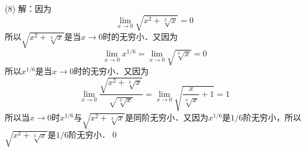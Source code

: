 \medskip
(8) 解：因为
\begin{equation}
    \lim_{x \to 0} \sqrt{x^2+\sqrt[3]{x}} = 0
\end{equation}
所以$\sqrt{x^2+\sqrt[3]{x}}$是当$x \to 0$时的无穷小．又因为
\begin{equation}
    \lim_{x \to 0} {\displaystyle x^{1/6}} = \lim_{x \to 0} \sqrt{\sqrt[3]{x}} = 0
\end{equation}
所以$x^{1/6}$是当$x \to 0$时的无穷小．又因为
\begin{equation}
    \lim_{x \to 0} \displaystyle\frac{\sqrt{x^2+\sqrt[3]{x}}}{\sqrt{\sqrt[3]{x}}} = \lim_{x \to 0} \displaystyle\sqrt{\displaystyle\frac{x}{\sqrt[3]{x}}+1} = 1
\end{equation}
所以当$x \to 0$时$x^{1/6}$与$\displaystyle\sqrt{x^2+\sqrt[3]{x}}$是同阶无穷小．又因为$x^{1/6}$是$1/6$阶无穷小，所以$\displaystyle\sqrt{x^2+\sqrt[3]{x}}$是$1/6$阶无穷小．\qed